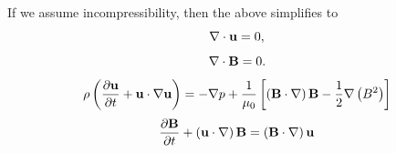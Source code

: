 \documentclass[a4paper,11pt]{report}
\begin{document}
If we assume incompressibility, then the above simplifies to
\begin{equation}
    \nabla \cdot \mathbf{u} = 0,
\end{equation}
\begin{equation}
    \nabla \cdot \mathbf{B} = 0.
    \end{equation}
\begin{equation}
    \rho \left (\frac{\partial \mathbf{u}}{\partial t} + \mathbf{u} \cdot \nabla \mathbf{u} \right ) = - \nabla p  + \frac{1}{\mu_0} \left [ \left ( \mathbf{B} \cdot \nabla \right ) \mathbf{B} - \frac{1}{2} \nabla \left ( B^2 \right ) \right ]
\end{equation}
\begin{equation}
    \frac{\partial \mathbf{B}}{\partial t} + \left ( \mathbf{u} \cdot \nabla \right ) \mathbf{B} = \left ( \mathbf{B} \cdot \nabla \right ) \mathbf{u}
\end{equation}
\end{document}
